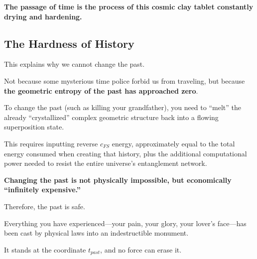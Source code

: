 \textbf{The passage of time is the process of this cosmic clay tablet constantly drying and hardening.}

\subsection{The Hardness of History}

This explains why we cannot change the past.

Not because some mysterious time police forbid us from traveling, but because \textbf{the geometric entropy of the past has approached zero}.

To change the past (such as killing your grandfather), you need to ``melt'' the already ``crystallized'' complex geometric structure back into a flowing superposition state.

This requires inputting reverse $c_{FS}$ energy, approximately equal to the total energy consumed when creating that history, plus the additional computational power needed to resist the entire universe's entanglement network.

\textbf{Changing the past is not physically impossible, but economically ``infinitely expensive.''}

Therefore, the past is safe.

Everything you have experienced---your pain, your glory, your lover's face---has been cast by physical laws into an indestructible monument.

It stands at the coordinate $t_{past}$, and no force can erase it.

